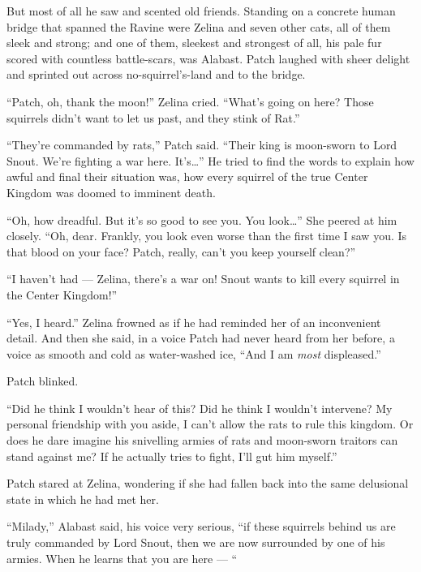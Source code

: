 \documentclass[ebook,oneside,openany,17pt]{memoir}
\newenvironment{tolerant}[1]{%
  \par\tolerance=#1\relax
}{%
  \par
}
\begin{document}
But most of all he saw and scented old friends. Standing on a concrete
human bridge that spanned the Ravine were Zelina and seven other cats,
all of them sleek and strong; and one of them, sleekest and strongest
of all, his pale fur scored with countless battle-scars, was
Alabast. Patch laughed with sheer delight and sprinted out across
no-squirrel’s-land and to the bridge.

\begin{tolerant}{5000}
“Patch, oh, thank the moon!” Zelina cried. “What’s going on here?
Those squirrels didn’t want to let us past, and they stink of Rat.”
\end{tolerant}

“They’re commanded by rats,” Patch said. “Their king is moon-sworn to
Lord Snout. We’re fighting a war here. It’s…” He tried to find the
words to explain how awful and final their situation was, how every
squirrel of the true Center Kingdom was doomed to imminent death.

“Oh, how dreadful. But it’s so good to see you. You look…” She peered
at him closely. “Oh, dear. Frankly, you look even worse than the first
time I saw you. Is that blood on your face? Patch, really, can’t you
keep yourself clean?”

“I haven’t had — Zelina, there’s a war on! Snout wants to kill every
squirrel in the Center Kingdom!”

“Yes, I heard.” Zelina frowned as if he had reminded her of an
inconvenient detail. And then she said, in a voice Patch had never
heard from her before, a voice as smooth and cold as water-washed ice,
“And I am \emph{most} displeased.”

Patch blinked.

“Did he think I wouldn’t hear of this? Did he think I wouldn’t
intervene? My personal friendship with you aside, I can’t allow the
rats to rule this kingdom. Or does he dare imagine his snivelling
armies of rats and moon-sworn traitors can stand against me? If he
actually tries to fight, I’ll gut him myself.”

\begin{tolerant}{1000}
Patch stared at Zelina, wondering if she had fallen back into the same
delusional state in which he had met her.
\end{tolerant}

“Milady,” Alabast said, his voice very serious, “if these squirrels
behind us are truly commanded by Lord Snout, then we are now
surrounded by one of his armies. When he learns that you are here — “
\end{document}
